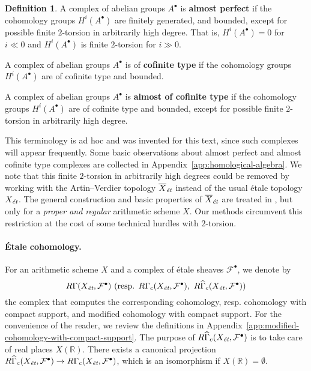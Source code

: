 \documentclass[leqno,12pt]{article}
\theoremstyle{plain}
\theoremstyle{definition}
\newtheorem{definition}[theorem]{\indent\sc Definition}
\newcommand{\RR}{\mathbb{R}}
\newcommand{\et}{\text{\it \'{e}t}}
\begin{document}
\begin{definition}
  \label{dfn:almost-of-(co)finite-type}
  A complex of abelian groups $A^\bullet$ is \textbf{almost perfect}
  if the cohomology groups $H^i (A^\bullet)$ are finitely generated, and
  bounded, except for possible finite $2$-torsion in arbitrarily high degree.
  That is, $H^i (A^\bullet) = 0$ for $i \ll 0$ and $H^i (A^\bullet)$ is finite
  $2$-torsion for $i \gg 0$.

  A complex of abelian groups $A^\bullet$ is of \textbf{cofinite type} if the
  cohomology groups $H^i (A^\bullet)$ are of cofinite type and bounded.

  A complex of abelian groups $A^\bullet$ is \textbf{almost of cofinite type}
  if the cohomology groups $H^i (A^\bullet)$ are of cofinite type and
  bounded, except for possible finite $2$-torsion in arbitrarily high
  degree.
\end{definition}

This terminology is ad hoc and was invented for this text, since such complexes
will appear frequently. Some basic observations about almost perfect and almost
cofinite type complexes are collected in
Appendix~\ref{app:homological-algebra}. We note that this finite $2$-torsion in
arbitrarily high degrees could be removed by working with the Artin--Verdier
topology $\overline{X}_\et$ instead of the usual \'{e}tale topology $X_\et$.
The general construction and basic properties of $\overline{X}_\et$ are treated
in \cite[Appendix~A]{Flach-Morin-2018}, but only for a \emph{proper and regular}
arithmetic scheme $X$. Our methods circumvent this restriction at the cost of
some technical hurdles with $2$-torsion.

\paragraph{\'{E}tale cohomology.}
For an arithmetic scheme $X$ and a complex of \'{e}tale sheaves
$\mathcal{F}^\bullet$, we denote by
\[ R\Gamma (X_\et, \mathcal{F}^\bullet) ~
  \text{(resp. }R\Gamma_c (X_\et, \mathcal{F}^\bullet), ~
  R\widehat{\Gamma}_c (X_\et, \mathcal{F}^\bullet)\text{)} \]
the complex that computes the corresponding cohomology, resp. cohomology with
compact support, and modified cohomology with compact support.  For the
convenience of the reader, we review the definitions in
Appendix~\ref{app:modified-cohomology-with-compact-support}. The purpose of
$R\widehat{\Gamma}_c (X_\et, \mathcal{F}^\bullet)$ is to take care of real
places $X (\RR)$. There exists a canonical projection
$R\widehat{\Gamma}_c (X_\et, \mathcal{F}^\bullet) \to R\Gamma_c (X_\et,
\mathcal{F}^\bullet)$, which is an isomorphism if $X (\RR) = \emptyset$.
\end{document}
